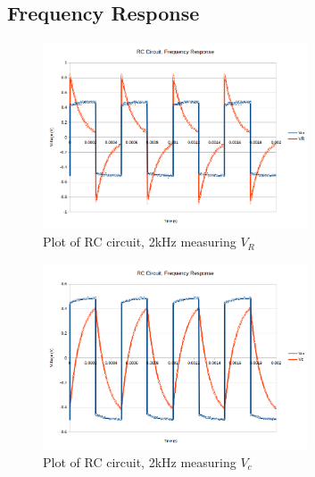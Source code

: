 \documentclass[10pt]{article}
\begin{document}
\subsection*{Frequency Response}
\begin{figure}[H]
	\centering
	\includegraphics[width=0.7\textwidth]{RC_Frequency_R}
	\caption{Plot of RC circuit, 2kHz measuring $V_R$}
\end{figure}
\begin{figure}[H]
	\centering
	\includegraphics[width=0.7\textwidth]{RC_Frequency_C}
	\caption{Plot of RC circuit, 2kHz measuring $V_c$}
\end{figure}
\end{document}
